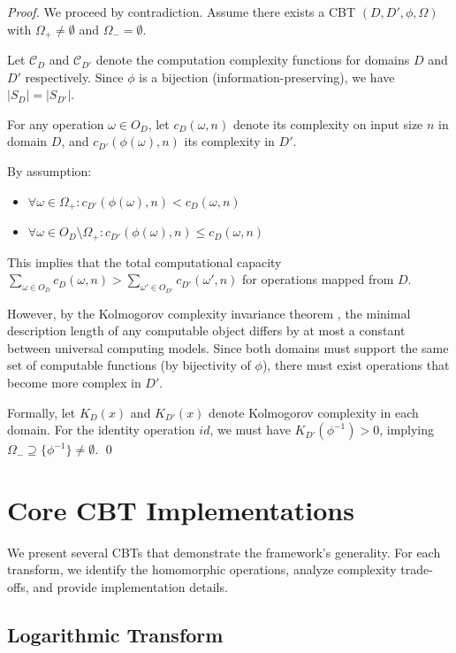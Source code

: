 \documentclass[12pt,a4paper]{article}
\theoremstyle{definition}
\begin{document}
\begin{proof}
We proceed by contradiction. Assume there exists a CBT $(D, D', \phi, \Omega)$ with $\Omega_+ \neq \emptyset$ and $\Omega_- = \emptyset$. 

Let $\mathcal{C}_D$ and $\mathcal{C}_{D'}$ denote the computation complexity functions for domains $D$ and $D'$ respectively. Since $\phi$ is a bijection (information-preserving), we have $|S_D| = |S_{D'}|$.

For any operation $\omega \in O_D$, let $c_D(\omega, n)$ denote its complexity on input size $n$ in domain $D$, and $c_{D'}(\phi(\omega), n)$ its complexity in $D'$.

By assumption:
\begin{itemize}
\item $\forall \omega \in \Omega_+: c_{D'}(\phi(\omega), n) < c_D(\omega, n)$
\item $\forall \omega \in O_D \setminus \Omega_+: c_{D'}(\phi(\omega), n) \leq c_D(\omega, n)$
\end{itemize}

This implies that the total computational capacity $\sum_{\omega \in O_D} c_D(\omega, n) > \sum_{\omega' \in O_{D'}} c_{D'}(\omega', n)$ for operations mapped from $D$.

However, by the Kolmogorov complexity invariance theorem \cite{li2008introduction}, the minimal description length of any computable object differs by at most a constant between universal computing models. Since both domains must support the same set of computable functions (by bijectivity of $\phi$), there must exist operations that become more complex in $D'$.

Formally, let $K_D(x)$ and $K_{D'}(x)$ denote Kolmogorov complexity in each domain. For the identity operation $id$, we must have $K_{D'}(\phi^{-1}) > 0$, implying $\Omega_- \supseteq \{\phi^{-1}\} \neq \emptyset$. \qed
\end{proof}

\section{Core CBT Implementations}

We present several CBTs that demonstrate the framework's generality. For each transform, we identify the homomorphic operations, analyze complexity trade-offs, and provide implementation details.

\subsection{Logarithmic Transform}
\end{document}
